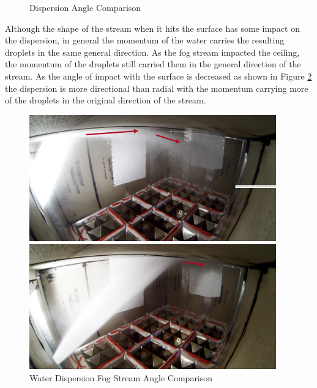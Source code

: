 \documentclass[12pt,oneside]{book}
\begin{document}
\begin{figure}[H]
\begin{minipage}[b]{0.45\textwidth}
	\end{minipage}
	\caption{Dispersion Angle Comparison}
	\label{fig:SS_Dispersion_Arrow}
\end{figure}

Although the shape of the stream when it hits the surface has some impact on the dispersion, in general the momentum of the water carries the resulting droplets in the same general direction. As the fog stream impacted the ceiling, the momentum of the droplets still carried them in the general direction of the stream. As the angle of impact with the surface is decreased as shown in Figure \ref{fig:ImpactFogStream} the dispersion is more directional than radial with the momentum carrying more of the droplets in the original direction of the stream.

\begin{figure}[H]
	\centering
	\begin{minipage}[b]{0.45\textwidth}
	\centering
	\includegraphics[width=0.95\textwidth]{Figures/Water_Distribution/Nozzle_Directions/Interior_MaxAngleCeiling_Fog_Arrows.png}
	\end{minipage}
	\begin{minipage}[b]{0.45\textwidth}
	\centering
	\includegraphics[width=0.95\textwidth]{Figures/Water_Distribution/Nozzle_Directions/Interior_MidCeiling_Fog_Arrows.png} 
	\end{minipage}
	\caption{Water Dispersion Fog Stream Angle Comparison}
	\label{fig:ImpactFogStream}
\end{figure}
\end{document}
